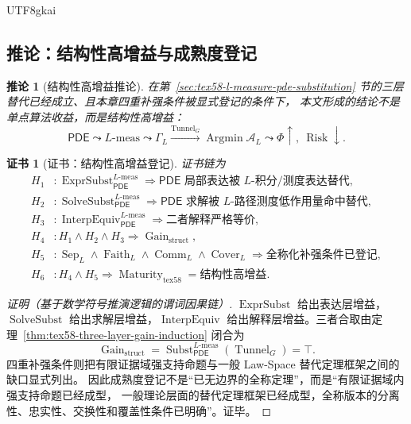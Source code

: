 \documentclass[12pt]{article}
\newtheorem{corollary}{推论}[section]
\newtheorem{Certificate}{证书}[section]
\newcommand{\PDE}{\ensuremath{\mathsf{PDE}}}
\DeclareMathOperator{\Gain}{Gain}
\DeclareMathOperator{\Risk}{Risk}
\DeclareMathOperator{\Tunnel}{Tunnel}
\DeclareMathOperator{\Subst}{Subst}
\DeclareMathOperator{\ExprSubst}{ExprSubst}
\DeclareMathOperator{\SolveSubst}{SolveSubst}
\DeclareMathOperator{\InterpEquiv}{InterpEquiv}
\DeclareMathOperator{\Sep}{Sep}
\DeclareMathOperator{\Faith}{Faith}
\DeclareMathOperator{\Cover}{Cover}
\DeclareMathOperator{\Comm}{Comm}
\DeclareMathOperator{\Maturity}{Maturity}
\newcommand{\Lmeas}{L\text{-}\mathrm{meas}}
\DeclareMathOperator*{\Argmin}{Argmin}
\begin{document}
\begin{CJK*}{UTF8}{gkai}
\subsection{推论：结构性高增益与成熟度登记}
\label{subsec:tex58-structural-high-gain-corollary}

\begin{corollary}[结构性高增益推论]
\label{cor:tex58-structural-high-gain}
在第~\ref{sec:tex58-l-measure-pde-substitution} 节的三层替代已经成立、且本章四重补强条件被显式登记的条件下，
本文形成的结论不是单点算法收益，而是结构性高增益：
\[
  \boxed{
  \PDE
  \leadsto
  \Lmeas
  \leadsto
  \Gamma_L
  \xrightarrow{\Tunnel_G}
  \Argmin\mathcal A_L
  \leadsto
  \Phi\uparrow,\ \Risk\downarrow.
  }
\]
\end{corollary}

\begin{Certificate}[证书：结构性高增益登记]
\label{cert:tex58-structural-high-gain}
证书链为
\[
\begin{aligned}
  H_1 &: \ExprSubst_{\PDE}^{\Lmeas}
  \Rightarrow
  \PDE\text{ 局部表达被 }L\text{-积分/测度表达替代},\\
  H_2 &: \SolveSubst_{\PDE}^{\Lmeas}
  \Rightarrow
  \PDE\text{ 求解被 }L\text{-路径测度低作用量命中替代},\\
  H_3 &: \InterpEquiv_{\PDE}^{\Lmeas}
  \Rightarrow
  \text{二者解释严格等价},\\
  H_4 &: H_1\wedge H_2\wedge H_3
  \Rightarrow
  \Gain_{\mathrm{struct}},\\
  H_5 &: \Sep_L\wedge\Faith_L\wedge\Comm_L\wedge\Cover_L
  \Rightarrow
  \text{全称化补强条件已登记},\\
  H_6 &: H_4\wedge H_5
  \Rightarrow
  \Maturity_{\mathrm{tex58}}
  =
  \text{结构性高增益}.
\end{aligned}
\]
\end{Certificate}

\begin{proof}[证明（基于数学符号推演逻辑的谓词因果链）]
\(\ExprSubst\) 给出表达层增益，\(\SolveSubst\) 给出求解层增益，\(\InterpEquiv\)
给出解释层增益。三者合取由定理~\ref{thm:tex58-three-layer-gain-induction} 闭合为
\[
  \Gain_{\mathrm{struct}}
  =
  \Subst_{\PDE}^{\Lmeas}(\Tunnel_G)=\top.
\]
四重补强条件则把有限证据域强支持命题与一般 Law-Space 替代定理框架之间的缺口显式列出。
因此成熟度登记不是“已无边界的全称定理”，而是“有限证据域内强支持命题已经成型，
一般理论层面的替代定理框架已经成型，全称版本的分离性、忠实性、交换性和覆盖性条件已明确”。证毕。
\end{proof}


\end{CJK*}
\end{document}
